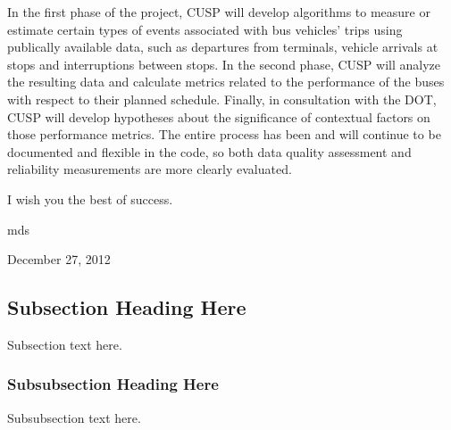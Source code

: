 \documentclass[12pt,journal,compsoc]{IEEEtran}
\begin{document}
In the first phase of the project, CUSP will develop algorithms to measure or estimate certain types of events associated with bus vehicles’ trips using publically­ available data, such as departures from terminals, vehicle arrivals at stops and interruptions between stops.  
In the second phase, CUSP will analyze the resulting data and calculate metrics related to the performance of the buses with respect to their planned schedule.  Finally, in consultation with the DOT, CUSP will develop hypotheses about the significance of contextual factors on those performance metrics.
The entire process has been and will continue to be documented and flexible in the code, so both data quality assessment and reliability measurements are more clearly evaluated.

I wish you the best of success.

\hfill mds
 
\hfill December 27, 2012

\subsection{Subsection Heading Here}
Subsection text here.


\subsubsection{Subsubsection Heading Here}
Subsubsection text here.


%
%
\end{document}
